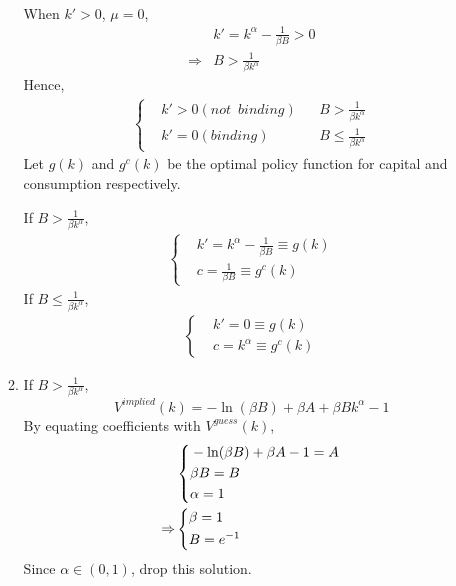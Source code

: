 \documentclass{article}
\begin{document}
\begin{enumerate}
\begin{enumerate}
\begin{align*}
            \end{align*}
            When $k'>0$, $\mu=0$,
            \begin{align*}
                &k'=k^\alpha-\frac{1}{\beta B}>0\\
                \Rightarrow&B>\frac{1}{\beta k^\alpha}
            \end{align*}
            Hence,
            \begin{align*}
                \left\{\begin{aligned}
                    &k'>0(not\enspace binding) &&B>\frac{1}{\beta k^\alpha}\\
                    &k'=0(binding) &&B\le\frac{1}{\beta k^\alpha}
                \end{aligned}\right.
            \end{align*}
            Let $g(k)$ and $g^c(k)$ be the optimal policy function for capital and consumption respectively.

            If $B>\frac{1}{\beta k^\alpha}$,
            \begin{align*}
                \left\{\begin{aligned}
                    &k'=k^\alpha-\frac{1}{\beta B}\equiv g(k)\\
                    &c=\frac{1}{\beta B}\equiv g^c(k)
                \end{aligned}\right.
            \end{align*}
            If $B\le\frac{1}{\beta k^\alpha}$,
            \begin{align*}
                \left\{\begin{aligned}
                    &k'=0\equiv g(k)\\
                    &c=k^\alpha\equiv g^c(k)
                \end{aligned}\right.
            \end{align*}
            \item If $B>\frac{1}{\beta k^\alpha}$,
            \begin{equation*}
                V^{implied}(k)=-\ln(\beta B)+\beta A+\beta Bk^\alpha-1
            \end{equation*}
            By equating coefficients with $V^{guess}(k)$,
            \begin{align*}
                &\left\{\begin{aligned}
                    &-\ln(\beta B)+\beta A-1=A\\
                    &\beta B=B\\
                    &\alpha=1
                \end{aligned}\right.\\
                \Rightarrow&
                \begin{dcases}
                    \beta=1\\
                    B=e^{-1}
                \end{dcases}
            \end{align*}
            Since $\alpha\in(0,1)$, drop this solution.


\end{enumerate}
\end{enumerate}
\end{document}

